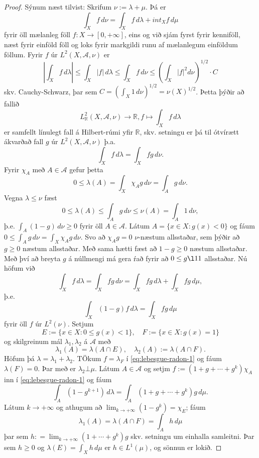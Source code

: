 \documentclass[a4paper,icelandic,11pt]{book}
\theoremstyle{plain}      \newtheorem{setn}{Setning}[chapter]
\theoremstyle{definition} \newtheorem{skilgr}[setn]{Skilgreining}
\theoremstyle{remark}     \newtheorem*{ath}{Athugasemd}
\newcommand{\R}{\mathbb R}
\begin{document}
\begin{proof}
  Sýnum næst tilvist: Skrifum $\nu := \lambda+\mu$. Þá er 
  \[
  \int_{X}f\,d\nu
  = \int_{X}f\,d\lambda + int_{X}f\,d\mu
  \]
  fyrir öll mælanleg föll $f:X\to[0,+\infty]$, eins og við sjám fyrst
  fyrir kenniföll, næst fyrir einföld föll og loks fyrir markgildi
  runu af mælanlegum einföldum föllum. Fyrir $f$ úr $L^{2}(X,\mathcal
  A,\nu)$ er 
  \[
  \left|
    \int_{X}f\,d\lambda
  \right|
  \le \int_{X}|f|\,d\lambda
  \le \int_{X}f\,d\nu
  \le \left( \int_{X}|f|^{2}d\nu \right)^{1/2}\cdot C
  \]
  skv. Cauchy-Schwarz, þar sem $C = \left(\int_{X}1\,d\nu\right)^{1/2}
  = \nu(X)^{1/2}$. Þetta þýðir að fallið 
  \[
  L_{\R}^{2}(X,\mathcal A,\nu)\to\R,
  f\mapsto \int_{X} f\,d\lambda
  \]
  er samfellt línulegt fall á Hilbert-rúmi yfir $\R$, skv. setningu er
  þá til ótvírætt ákvarðað fall $g$ úr $L^{2}(X,\mathcal A,\nu)$ þ.a. 
  \[
  \int_{X}f\,d\lambda = \int_{X}fg\,d\nu.
  \]
  Fyrir $\chi_{A}$ með $A\in\mathcal A$ gefur þetta 
  \[
  0 \le \lambda(A)
  = \int_{X}\chi_{A}g\,d\nu
  = \int_{A}g\,d\nu.
  \]
  Vegna $\lambda\le\nu$ fæst 
  \[
  0
  \le \lambda(A)
  \le \int_{A}g\,d\nu
  \le \nu(A)
  = \int_{A}1\,d\nu,
  \]
  þ.e. $\int_{A}(1-g)\,d\nu\ge 0$ fyrir öll $A\in \mathcal A$. Látum
  $A = \{ x\in X : g(x) < 0 \}$ og fáum $0\le\int_{A}g\,d\nu =
  \int_{X}\chi_{A}g\,d\nu$. Svo að $\chi_{A}g = 0$ $\nu$-næstum
  allsstaðar, sem þýðir að $g\ge 0$ næstum allsstaðar. Með sama hætti
  fæst að $1-g\ge 0$ næstum allsstaðar. Með því að breyta $g$ á
  núllmengi má gera ŕað fyrir að $0\le g\l1 1$ allsstaðar. Nú höfum
  við  
  \[
  \int_{X} f\,d\lambda
  = \int_{X} fg\,d\nu
  = \int_{X} fg\,d\lambda + \int_{X} fg\,d\mu,
  \]
  þ.e.
  \begin{equation}
    \label{eq:lebesgue-radon-1}
    \int_{X}(1-g)f\,d\lambda
    = \int_{X}fg\,d\mu
  \end{equation}
  fyrir öll $f$ úr $L^{2}(\nu)$. Setjum 
  \[
  E := \{x\in X : 0\le g(x) < 1 \},
  \quad
  F := \{x\in X : g(x) = 1 \}
  \]
  og skilgreinum mál $\lambda_{1},\lambda_{2}$ á $\mathcal A$ með 
  \[
  \lambda_{1}(A) = \lambda(A\cap E),
  \quad
  \lambda_{2}(A) := \lambda(A\cap F).
  \]
  Höfum þá $\lambda = \lambda_{1}+\lambda_{2}$. TÖkum $f =
  \lambda_{F}$ í \eqref{eq:lebesgue-radon-1} og fáum
  $\lambda(F)=0$. Þar með er $\lambda_{2}\bot\mu$. Látum $A\in\mathcal
  A$ og setjm $f:=(1+g+\cdots+g^{k})\chi_{A}$ inn í
  \eqref{eq:lebesgue-radon-1} og fáum 
  \[
  \int_{A}(1-g^{k+1})\,d\lambda
  = \int_{A}(1+g+\cdots+g^{k})g\,d\mu.
  \]
  Látum $k\to+\infty$ og athugum að
  $\lim_{k\to+\infty}(1-g^{k})=\chi_{E}$; fáum 
  \[
  \lambda_{1}(A) = \lambda(A\cap F) = \int_{A}h\,d\mu
  \]
  þar sem $h : = \lim_{k\to+\infty}(1+\cdots+g^{k})g$ skv. setningu um
  einhalla samleitni. Þar sem $h\ge 0$ og $\lambda(E)=\int_{X}h\,d\mu$
  er $h\in L^{1}(\mu)$, og sönnun er lokið.
\end{proof}
\end{document}
